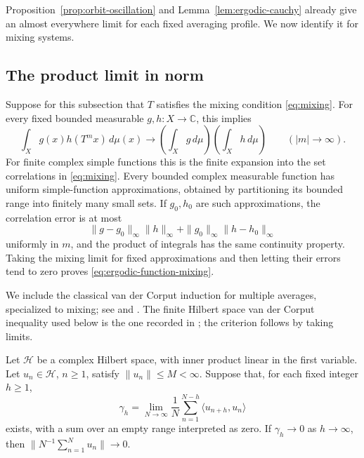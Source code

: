 Proposition~\ref{prop:orbit-oscillation} and
Lemma~\ref{lem:ergodic-cauchy} already give an almost everywhere limit
for each fixed averaging profile.  We now identify it for mixing systems.

\subsection{The product limit in norm}

Suppose for this subsection that \(T\) satisfies the mixing condition
\eqref{eq:mixing}.
For every fixed bounded measurable \(g,h:X\to\mathbb C\), this implies
\begin{equation}
 \int_X g(x)h(T^m x)\,d\mu(x)
   \longrightarrow
      \left(\int_Xg\,d\mu\right)\left(\int_Xh\,d\mu\right)
       \qquad(|m|\to\infty).
 \label{eq:ergodic-function-mixing}
\end{equation}
For finite complex simple functions this is the finite expansion into
the set correlations in \eqref{eq:mixing}.  Every bounded
complex measurable function has uniform simple-function approximations,
obtained by partitioning its bounded range into finitely many small sets.
If \(g_0,h_0\) are such approximations, the correlation error is at most
\[
 \|g-g_0\|_\infty\|h\|_\infty+
        \|g_0\|_\infty\|h-h_0\|_\infty
\]
uniformly in \(m\), and the product of integrals has the same continuity
property.  Taking the mixing limit for fixed approximations and then
letting their errors tend to zero proves
\eqref{eq:ergodic-function-mixing}.

We include the classical van der Corput induction for multiple averages,
specialized to mixing; see \cite[Section~3]{FKO1982} and
\cite[Section~3]{Bergelson1987}.  The finite Hilbert space van der Corput
inequality used below is the one recorded in \cite[Lemma~D.1]{HostKra2005};
the criterion follows by taking limits.
\begin{lemma}
\label{lem:ergodic-vdc}
Let \(\mathcal H\) be a complex Hilbert space, with inner product linear
in the first variable.  Let \(u_n\in\mathcal H\), \(n\geq1\), satisfy
\(\|u_n\|\leq M<\infty\).  Suppose that, for each fixed integer \(h\geq1\),
\[
 \gamma_h=\lim_{N\to\infty}
       \frac1N\sum_{n=1}^{N-h}\langle u_{n+h},u_n\rangle
\]
exists, with a sum over an empty range interpreted as zero.  If
\(\gamma_h\to0\) as \(h\to\infty\), then
\(\|N^{-1}\sum_{n=1}^Nu_n\|\to0\).
\end{lemma}

